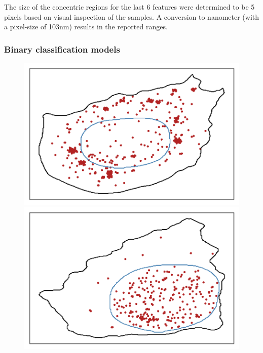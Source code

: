 The size of the concentric regions for the last 6 features were determined to be 5 pixels based on visual inspection of the samples.
A conversion to nanometer (with a pixel-size of 103nm) results in the reported ranges.

\subsubsection{Binary classification models}

\begin{figure}[]
	\centering
		\includegraphics[trim={0.5cm 0.5cm 0.5cm 0.5cm},clip,width=\linewidth]{figures/chapter5/plot_foci}
	\endminipage\hfill
		\includegraphics[trim={0.5cm 0.5cm 0.5cm 0.5cm},clip,width=\linewidth]{figures/chapter5/plot_intranuclear}
	\endminipage\hfill

\end{figure}
